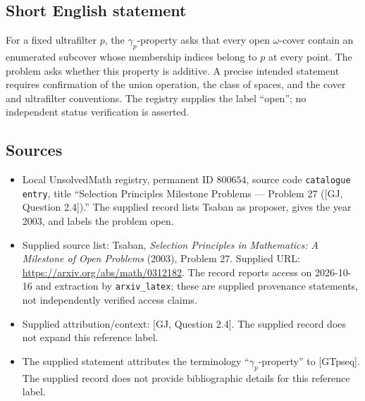 \documentclass[11pt]{article}
\begin{document}
\subsection{Short English statement}
For a fixed ultrafilter \(p\), the \(\gamma_p\)-property asks that every open \(\omega\)-cover contain an enumerated subcover whose membership indices belong to \(p\) at every point. The problem asks whether this property is additive. A precise intended statement requires confirmation of the union operation, the class of spaces, and the cover and ultrafilter conventions. The registry supplies the label ``open''; no independent status verification is asserted.
\subsection{Sources}
\begin{itemize}
\item Local UnsolvedMath registry, permanent ID \(800654\), source code \texttt{catalogue entry}, title ``Selection Principles Milestone Problems --- Problem 27 ([GJ, Question 2.4]).'' The supplied record lists Tsaban as proposer, gives the year 2003, and labels the problem open.
\item Supplied source list: Tsaban, \emph{Selection Principles in Mathematics: A Milestone of Open Problems} (2003), Problem 27. Supplied URL: \url{https://arxiv.org/abs/math/0312182}. The record reports access on 2026-10-16 and extraction by \texttt{arxiv\_latex}; these are supplied provenance statements, not independently verified access claims.
\item Supplied attribution/context: [GJ, Question 2.4]. The supplied record does not expand this reference label.
\item The supplied statement attributes the terminology ``\(\gamma_p\)-property'' to [GTpseq]. The supplied record does not provide bibliographic details for this reference label.
\end{itemize}
\end{document}
